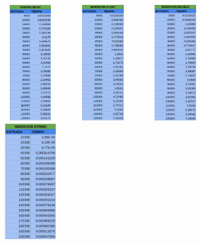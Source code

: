 \documentclass[11pt]{article}
\begin{document}
\begin{figure}[H]
    \begin{minipage}{0.5\textwidth}
        \centering
        \includegraphics[width=3cm, height=5cm]{assets/Img/inserciontabla1.png}

    \end{minipage}%
    \begin{minipage}{0.5\textwidth}
        \centering
        \includegraphics[width=3cm, height=5cm]{assets/Img/inserciontabla2.png}

    \end{minipage}
    \begin{minipage}{0.5\textwidth}
        \centering
        \includegraphics[width=3cm, height=5cm]{assets/Img/inserciontabla3.png}

    \end{minipage}
    \begin{minipage}{0.5\textwidth}
        \centering
        \includegraphics[width=3cm, height=5cm]{assets/Img/inserciontabla4.png}
    \end{minipage}
\end{figure}
\end{document}

